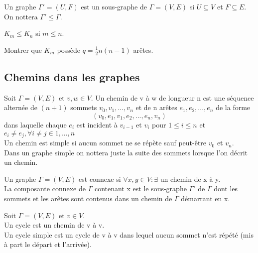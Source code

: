 \begin{defn}
Un graphe ${\Gamma}'=(U,F)$ est un sous-graphe de $\Gamma=(V,E)$ si $ U \subseteq V$ et $F \subseteq E$. On nottera $ {\Gamma}' \leq \Gamma$.
\end{defn}

\begin{exmp}
$ K_{m} \leq K_{n}$ si $ m \leq n$.
\end{exmp}

\begin{exo}
Montrer que $K_{m}$ possède $ q=\frac{1}{2}n(n-1)$ arêtes.
\end{exo}

\subsection{Chemins dans les graphes}

\begin{defn}
Soit $\Gamma = (V,E)$ et $v,w \in V$. Un chemin de v à w de longueur n est une séquence alternée de $(n+1)$ sommets $v_{0},v_{1},...,v_{n}$ et de n arêtes $e_{1},e_{2},...,e_{n}$ de la forme $$ (v_{0},e_{1},v_{1},e_{2},...,e_{n},v_{n})$$ dans laquelle chaque $e_{i}$ est incident à $v_{i-1}$ et $v_{i}$ pour $1 \leq i \leq n$ et $ e_{i} \neq e_{j} , \forall i \neq j \in 1,...,n$ \\

Un chemin est simple si aucun sommet ne se répète sauf peut-être $v_{0}$ et $v_{n}$. \\

Dans un graphe simple on nottera juste la suite des sommets lorsque l'on décrit un chemin. \\

\end{defn}

\begin{defn}
Un graphe $\Gamma = (V,E)$ est connexe si $\forall x,y \in V : \exists $ un chemin de x à y. \\

La composante connexe de $\Gamma$ contenant x est le sous-graphe ${\Gamma}'$ de $\Gamma$ dont les sommets et les arêtes sont contenus dans un chemin de $\Gamma$ démarrant en x. \\
\end{defn}

\begin{defn}
Soit $\Gamma = (V,E)$ et $v \in V$.\\

Un cycle est un chemin de v à v.\\

Un cycle simple est un cycle de v à v dans lequel aucun sommet n'est répété (mis à part le départ et l'arrivée).\\
\end{defn}

